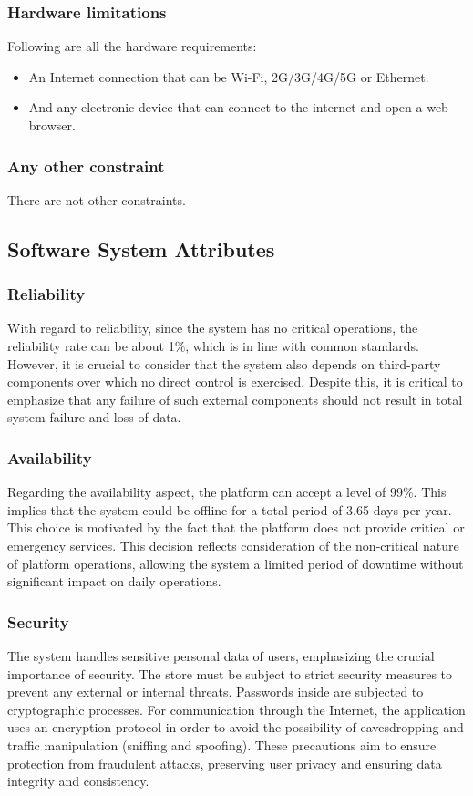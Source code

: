 \subsubsection{Hardware limitations}
Following are all the hardware requirements:
\begin{itemize}
    \item An Internet connection that can be Wi-Fi, 2G/3G/4G/5G or Ethernet.
    \item And any electronic device that can connect to the internet and open a web browser. 
\end{itemize}

\subsubsection{Any other constraint}
There are not other constraints.

\subsection{Software System Attributes}

\subsubsection{Reliability}
With regard to reliability, since the system has no critical operations, the reliability rate can be about 1\%, which is in line with common standards. However, it is crucial to consider that the system also depends on third-party components over which no direct control is exercised. Despite this, it is critical to emphasize that any failure of such external components should not result in total system failure and loss of data.

\subsubsection{Availability}
Regarding the availability aspect, the platform can accept a level of 99\%. This implies that the system could be offline for a total period of 3.65 days per year. This choice is motivated by the fact that the platform does not provide critical or emergency services.
This decision reflects consideration of the non-critical nature of platform operations, allowing the system a limited period of downtime without significant impact on daily operations.

\subsubsection{Security}
The system handles sensitive personal data of users, emphasizing the crucial importance of security. The store must be subject to strict security measures to prevent any external or internal threats. Passwords inside are subjected to cryptographic processes. For communication through the Internet, the application uses an encryption protocol in order to avoid the possibility of eavesdropping and traffic manipulation (sniffing and spoofing). These precautions aim to ensure protection from fraudulent attacks, preserving user privacy and ensuring data integrity and consistency.

